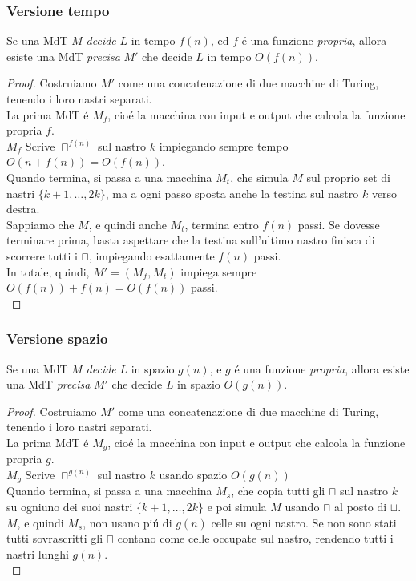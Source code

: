\subsubsection{Versione tempo}
Se una MdT $M$ \textit{decide} $L$ in tempo $f(n)$, ed $f$ é una funzione \textit{propria}, allora esiste una MdT \textit{precisa} $M'$ che decide $L$ in tempo $O(f(n))$. \\
\begin{proof}
Costruiamo $M'$ come una concatenazione di due macchine di Turing, tenendo i loro nastri separati. \\
La prima MdT é $M_f$, cioé la macchina con input e output che calcola la funzione propria $f$. \\
$M_f$ Scrive $\sqcap^{f(n)}$ sul nastro $k$  impiegando sempre tempo $O(n + f(n)) = O(f(n))$. \\
Quando termina, si passa a una macchina $M_t$, che simula $M$ sul proprio set di nastri $\{k+1, \dots, 2k\}$, ma a ogni passo sposta anche la testina sul nastro $k$ verso destra. \\
Sappiamo che $M$, e quindi anche $M_t$, termina entro $f(n)$ passi. Se dovesse terminare prima, basta aspettare che la testina sull'ultimo nastro finisca di scorrere tutti i $\sqcap$, impiegando esattamente $f(n)$ passi. \\
In totale, quindi, $M' = (M_f, M_t)$ impiega sempre $O(f(n)) + f(n) = O(f(n))$ passi. \\
\end{proof}

\subsubsection{Versione spazio}
Se una MdT $M$ \textit{decide} $L$ in spazio $g(n)$, e $g$ é una funzione \textit{propria}, allora esiste una MdT \textit{precisa} $M'$ che decide $L$ in spazio $O(g(n))$. \\
\begin{proof}
Costruiamo $M'$ come una concatenazione di due macchine di Turing, tenendo i loro nastri separati. \\
La prima MdT é $M_g$, cioé la macchina con input e output che calcola la funzione propria $g$. \\
$M_g$ Scrive $\sqcap^{g(n)}$ sul nastro $k$  usando spazio $O(g(n))$ \\
Quando termina, si passa a una macchina $M_s$, che copia tutti gli $\sqcap$ sul nastro $k$ su ogniuno dei suoi nastri $\{k+1, \dots, 2k\}$ e poi simula $M$ usando $\sqcap$ al posto di $\sqcup$. \\
$M$, e quindi $M_s$, non usano piú di $g(n)$ celle su ogni nastro. Se non sono stati tutti sovrascritti gli $\sqcap$ contano come celle occupate sul nastro, rendendo tutti i nastri lunghi $g(n)$. \\
\end{proof}


